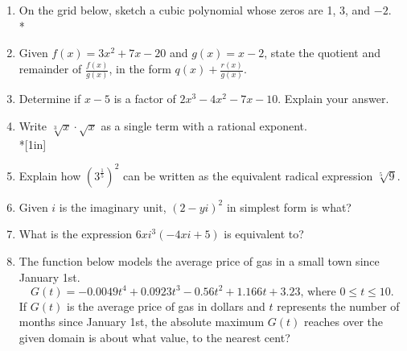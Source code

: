 \documentclass[12pt, twoside]{article}
\begin{document}
\begin{enumerate}
\newpage

\item On the grid below, sketch a cubic polynomial whose zeros are 1, 3, and $-2$.\\*
\begin{center}
\end{center} %

\newpage

\item Given $f(x)=3x^2+7x-20$ and $g(x)=x-2$, state the quotient and remainder of $\displaystyle \frac{f(x)}{g(x)}$, in the form $\displaystyle q(x)+ \frac{r(x)}{g(x)}$. \\[4in] %

\item Determine if $x-5$ is a factor of $2x^3-4x^2-7x-10$. Explain your answer. %
\newpage

\item Write $\sqrt[3]x \cdot \sqrt{x}$ as a single term with a rational exponent. %
\\*[1in]

\item Explain how $\displaystyle \left(3^{\frac{1}{5}} \right)^2$ can be written as the equivalent radical expression $\sqrt[5]9$. \\[2in]%


\item Given $i$ is the imaginary unit, $(2-yi)^2$ in simplest form is what? \\[1.5in] %

\item What is the expression $6xi^3(-4xi+5)$ is equivalent to?  %
\newpage

\item The function below models the average price of gas in a small town since January 1st.
\[G(t)=-0.0049t^4 + 0.0923t^3 - 0.56t^2 +1.166t+3.23 \text{, where } 0 \leq t \leq 10.\]
If $G(t)$ is the average price of gas in dollars and $t$ represents the number of months since January 1st, the absolute maximum $G(t)$ reaches over the given domain is about what value, to the nearest cent? \\[3in] %


\end{enumerate}
\end{document}
